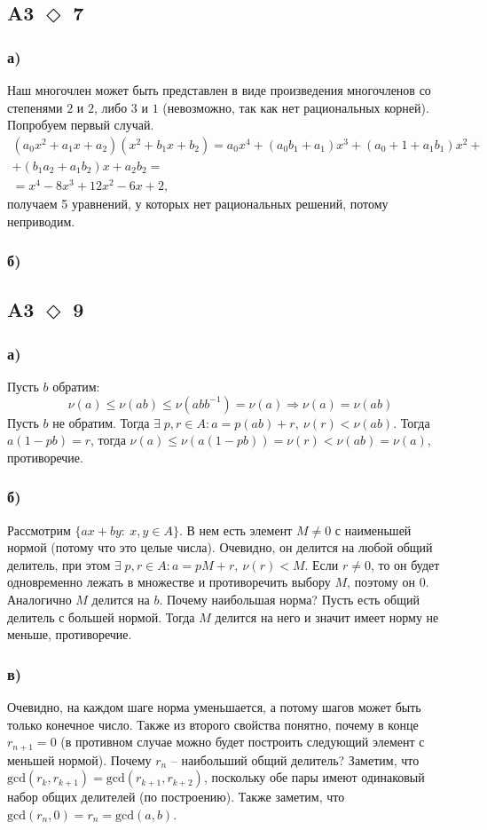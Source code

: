 \documentclass[a4paper]{article}
\newcommand{\task}[2]{A#1 $\Diamond$ #2}
\begin{document}
  \subsection*{\task{3}{7}}
  \subsubsection*{а)}
  Наш многочлен может быть представлен в виде произведения многочленов со степенями $2$ и $2$, либо $3$ и $1$ (невозможно, так как нет рациональных корней). Попробуем первый случай.
  \begin{eqnarray*}
    (a_0 x^2 + a_1 x + a_2) (x^2 + b_1 x + b_2) = a_0 x^4 + (a_0 b_1 + a_1)x^3 + (a_0 + 1 + a_1 b_1)x^2 +\\
    + (b_1 a_2 + a_1 b_2)x + a_2 b_2 = \\ = x^4 - 8 x^3 + 12 x^2 - 6 x + 2,
  \end{eqnarray*}
  получаем 5 уравнений, у которых нет рациональных решений, потому неприводим.
  \subsubsection*{б)}

  \subsection*{\task{3}{9}}
  \subsubsection*{а)}
  Пусть $b$ обратим:
  $$\nu(a) \le \nu(ab) \le \nu(abb^{-1}) = \nu(a) \Longrightarrow \nu(a) = \nu(ab)$$
  Пусть $b$ не обратим. Тогда $\exists\; p, r \in A: a = p(ab) + r,\:\nu(r) < \nu(ab)$. Тогда $a(1 - pb) = r$, тогда $\nu(a) \le \nu(a(1 - pb)) = \nu(r) < \nu(ab)= \nu(a)$, противоречие.
  \subsubsection*{б)}
  Рассмотрим $\{ax + by:\:x,y \in A\}$. В нем есть элемент $M \ne 0$ с наименьшей нормой (потому что это целые числа). Очевидно, он делится на любой общий делитель, при этом $\exists\; p, r \in A: a = pM + r,\: \nu(r) < M$. Если $r \ne 0$, то он будет одновременно лежать в множестве и противоречить выбору $M$, поэтому он $0$. Аналогично $M$ делится на $b$. Почему наибольшая норма? Пусть есть общий делитель с большей нормой. Тогда $M$ делится на него и значит имеет норму не меньше, противоречие.
  \subsubsection*{в)}
  Очевидно, на каждом шаге норма уменьшается, а потому шагов может быть только конечное число. Также из второго свойства понятно, почему в конце $r_{n + 1} = 0$ (в противном случае можно будет построить следующий элемент с меньшей нормой). Почему $r_n$ -- наибольший общий делитель? Заметим, что $\mathrm{gcd}(r_k, r_{k + 1}) = \mathrm{gcd}(r_{k+1}, r_{k + 2})$, поскольку обе пары имеют одинаковый набор общих делителей (по построению). Также заметим, что $\mathrm{gcd}(r_n, 0) = r_n = \mathrm{gcd}(a, b)$.
\end{document}
